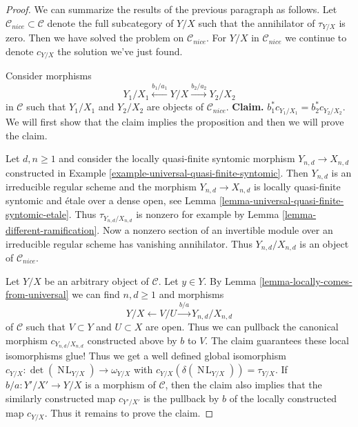 \documentclass[10pt,a4paper]{amsart}
\theoremstyle{plain}
\theoremstyle{definition}
\theoremstyle{remark}
\numberwithin{equation}{subsection}
\def\NL{\mathop{N\!L}\nolimits}
\begin{document}
\begin{proof}
\medskip\noindent
We can summarize the results of the previous paragraph as follows.
Let $\mathcal{C}_{nice} \subset \mathcal{C}$ denote the
full subcategory of $Y/X$ such that the annihilator of
$\tau_{Y/X}$ is zero. Then we have solved the problem
on $\mathcal{C}_{nice}$. For $Y/X$ in $\mathcal{C}_{nice}$
we continue to denote $c_{Y/X}$ the solution we've just found.

\medskip\noindent
Consider morphisms
$$
Y_1/X_1 \xleftarrow{b_1/a_1} Y/X \xrightarrow{b_2/a_2} Y_2/X_2
$$
in $\mathcal{C}$ such that $Y_1/X_1$ and $Y_2/X_2$ are objects
of $\mathcal{C}_{nice}$. {\bf Claim.} $b_1^*c_{Y_1/X_1} = b_2^*c_{Y_2/X_2}$.
We will first show that the claim implies the proposition
and then we will prove the claim.

\medskip\noindent
Let $d, n \geq 1$ and consider the locally
quasi-finite syntomic morphism $Y_{n, d} \to X_{n, d}$
constructed in Example \ref{example-universal-quasi-finite-syntomic}.
Then $Y_{n, d}$ is an irreducible regular scheme and the
morphism $Y_{n, d} \to X_{n, d}$ is locally quasi-finite syntomic
and \'etale over a dense open, see
Lemma \ref{lemma-universal-quasi-finite-syntomic-etale}.
Thus $\tau_{Y_{n, d}/X_{n, d}}$ is nonzero for example by
Lemma \ref{lemma-different-ramification}. Now a nonzero section
of an invertible module over an irreducible regular scheme
has vanishing annihilator. Thus
$Y_{n, d}/X_{n, d}$ is an object of $\mathcal{C}_{nice}$.

\medskip\noindent
Let $Y/X$ be an arbitrary object of $\mathcal{C}$. Let $y \in Y$.
By Lemma \ref{lemma-locally-comes-from-universal} we can find
$n, d \geq 1$ and morphisms
$$
Y/X \leftarrow V/U \xrightarrow{b/a} Y_{n, d}/X_{n, d}
$$
of $\mathcal{C}$ such that $V \subset Y$ and $U \subset X$ are open.
Thus we can pullback the canonical morphism $c_{Y_{n, d}/X_{n, d}}$
constructed above by $b$ to $V$. The claim guarantees these local
isomorphisms glue! Thus we get a well defined global isomorphism
$c_{Y/X} : \det(\NL_{Y/X}) \to \omega_{Y/X}$ with
$c_{Y/X}(\delta(\NL_{Y/X})) = \tau_{Y/X}$.
If $b/a : Y'/X' \to Y/X$ is a morphism of $\mathcal{C}$, then
the claim also implies that the similarly constructed map
$c_{Y'/X'}$ is the pullback by $b$ of the locally constructed
map $c_{Y/X}$. Thus it remains to prove the claim.


\end{proof}
\end{document}
